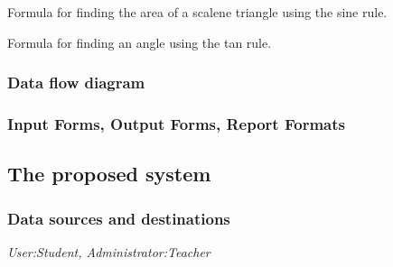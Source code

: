 \begin{algorithm}[H]
\caption{Formula for finding the area of a scalene triangle using the sine rule.}
\begin{algorithmic}[1]
\Else{}
\EndIf
\end{algorithmic}
\end{algorithm}

\begin{algorithm}[H]
\caption{Formula for finding an angle using the tan rule.}
\begin{algorithmic}[1]
\Else{}
\EndIf
\end{algorithmic}
\end{algorithm}

\subsubsection{Data flow diagram}

\subsubsection{Input Forms, Output Forms, Report Formats}

\subsection{The proposed system}

\subsubsection{Data sources and destinations}

\textit{User:Student, Administrator:Teacher}

